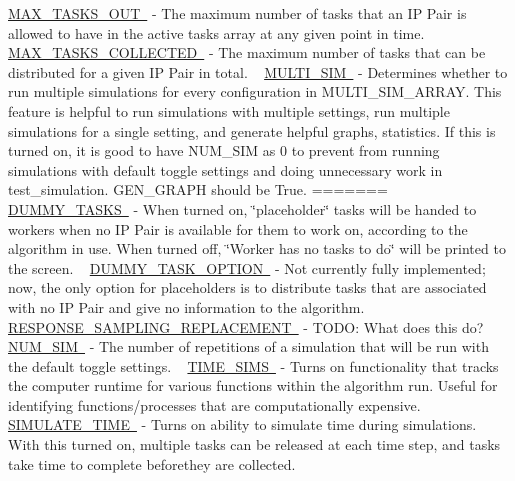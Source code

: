  \mbox{\hyperlink{namespacedynamicfilterapp_1_1toggles_a27cea6b210bbcb9af3fbd7edc3901390}{M\+A\+X\+\_\+\+T\+A\+S\+K\+S\+\_\+\+O\+UT }} -\/ The maximum number of tasks that an IP Pair is allowed to have in the active tasks array at any given point in time. ~\newline
 \mbox{\hyperlink{namespacedynamicfilterapp_1_1toggles_aa05c90c0672e9b74717bdeabb00fd1bb}{M\+A\+X\+\_\+\+T\+A\+S\+K\+S\+\_\+\+C\+O\+L\+L\+E\+C\+T\+ED }} -\/ The maximum number of tasks that can be distributed for a given IP Pair in total. ~\newline
 \mbox{\hyperlink{namespacedynamicfilterapp_1_1toggles_a8822be27c516d0f027cff60d067b6d87}{M\+U\+L\+T\+I\+\_\+\+S\+IM }} -\/ Determines whether to run multiple simulations for every configuration in M\+U\+L\+T\+I\+\_\+\+S\+I\+M\+\_\+\+A\+R\+R\+AY. This feature is helpful to run simulations with multiple settings, run multiple simulations for a single setting, and generate helpful graphs, statistics. If this is turned on, it is good to have N\+U\+M\+\_\+\+S\+IM as 0 to prevent from running simulations with default toggle settings and doing unnecessary work in test\+\_\+simulation. G\+E\+N\+\_\+\+G\+R\+A\+PH should be True.
=======
\mbox{\hyperlink{}{D\+U\+M\+M\+Y\+\_\+\+T\+A\+S\+KS }} -\/ When turned on, \char`\"{}placeholder\char`\"{} tasks will be handed to workers when no IP Pair is available for them to work on, according to the algorithm in use. When turned off, \char`\"{}\+Worker has no tasks to do\char`\"{} will be printed to the screen. ~\newline
 \mbox{\hyperlink{}{D\+U\+M\+M\+Y\+\_\+\+T\+A\+S\+K\+\_\+\+O\+P\+T\+I\+ON }} -\/ Not currently fully implemented; now, the only option for placeholders is to distribute tasks that are associated with no IP Pair and give no information to the algorithm. ~\newline
 \mbox{\hyperlink{}{R\+E\+S\+P\+O\+N\+S\+E\+\_\+\+S\+A\+M\+P\+L\+I\+N\+G\+\_\+\+R\+E\+P\+L\+A\+C\+E\+M\+E\+NT }} -\/ T\+O\+DO\+: What does this do? ~\newline
 \mbox{\hyperlink{}{N\+U\+M\+\_\+\+S\+IM }} -\/ The number of repetitions of a simulation that will be run with the default toggle settings. ~\newline
 \mbox{\hyperlink{}{T\+I\+M\+E\+\_\+\+S\+I\+MS }} -\/ Turns on functionality that tracks the computer runtime for various functions within the algorithm run. Useful for identifying functions/processes that are computationally expensive. ~\newline
 \mbox{\hyperlink{}{S\+I\+M\+U\+L\+A\+T\+E\+\_\+\+T\+I\+ME }} -\/ Turns on ability to simulate time during simulations. With this turned on, multiple tasks can be released at each time step, and tasks take time to complete beforethey are collected. ~\newline
